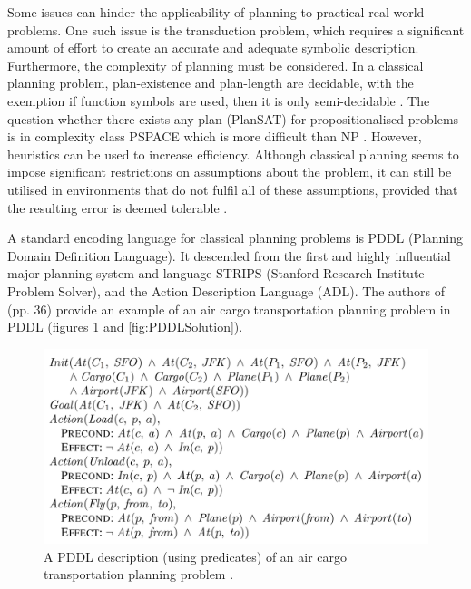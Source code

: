 \documentclass{article}
\begin{document}
Some issues can hinder the applicability of planning to practical real-world problems. One such issue is the transduction problem, which requires a significant amount of effort to create an accurate and adequate symbolic description. Furthermore, the complexity of planning must be considered. In a classical planning problem, plan-existence and plan-length are decidable, with the exemption if function symbols are used, then it is only semi-decidable \cite{ghallab_automated_2004}. The question whether there exists any plan (PlanSAT) for propositionalised problems is in complexity class PSPACE which is more difficult than NP \cite{russell_artificial_2010}. However, heuristics can be used to increase efficiency. Although classical planning seems to impose significant restrictions on assumptions about the problem, it can still be utilised in environments that do not fulfil all of these assumptions, provided that the resulting error is deemed tolerable \cite{ghallab_nau_traverso_2016}.



A standard encoding language for classical planning problems is PDDL (Planning Domain Definition Language). It descended from the first and highly influential major planning system and language STRIPS (Stanford Research Institute Problem Solver), and the Action Description Language (ADL).  The authors of \cite{russell_artificial_2010} (pp. 36) provide an example of an air cargo transportation planning problem in PDDL (figures \ref{fig:PDDL} and \ref{fig:PDDLSolution}).

\begin{figure}[h]
	\centering
	\includegraphics[width=0.6\linewidth]{RN_PDDL-AirCargo.png}
	\caption{A PDDL description (using predicates) of an air cargo transportation planning problem \cite{russell_artificial_2010}.}
	\label{fig:PDDL}
\end{figure}
\end{document}
